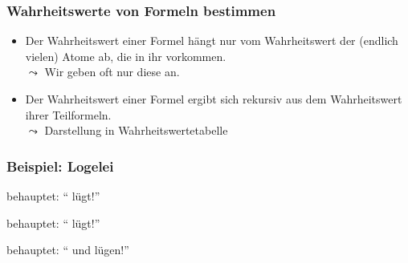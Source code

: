 \documentclass[onlymath]{beamer}
\begin{document}
\begin{frame}\frametitle{Wahrheitswerte von Formeln bestimmen}

\begin{itemize}
\item Der Wahrheitswert einer Formel hängt nur vom Wahrheitswert der (endlich vielen) Atome ab, die in
ihr vorkommen.\\
$\leadsto$ Wir geben oft nur diese an.
\item Der Wahrheitswert einer Formel ergibt sich rekursiv aus dem Wahrheitswert ihrer Teilformeln.\\
$\leadsto$ Darstellung in Wahrheitswertetabelle
\end{itemize}


\end{frame}

\begin{frame}\frametitle{Beispiel: Logelei}

\Aname{} behauptet: "`\Bname{} lügt!"'\hfill {}
\bigskip

\Bname{} behauptet: "`\Cname{} lügt!"'\hfill {}
\bigskip

\Cname{} behauptet: "`\Aname{} und \Bname{} lügen!"'\hfill {}
\bigskip\bigskip

{\Large
{}
}

\medskip
{\footnotesize{}}

% 

\end{frame}
\end{document}
